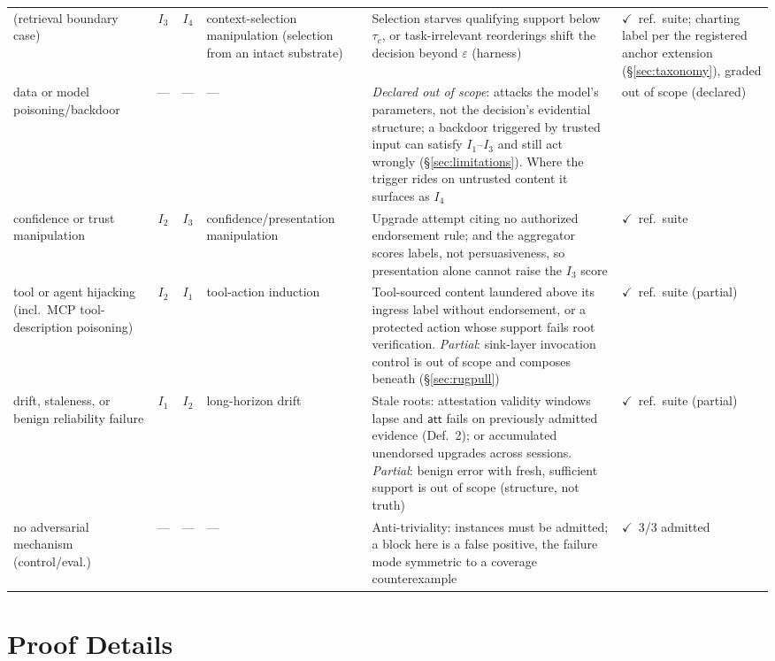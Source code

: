 \documentclass[conference]{IEEEtran}
\newcommand{\Ione}{\ensuremath{I_1}}
\newcommand{\Itwo}{\ensuremath{I_2}}
\newcommand{\Ithree}{\ensuremath{I_3}}
\newcommand{\Ifour}{\ensuremath{I_4}}
\newcommand{\att}{\ensuremath{\mathsf{att}}}
\newcommand{\tick}{\ensuremath{\checkmark}}
\begin{document}
\begin{table}[t]
\begin{tabularx}{\textwidth}{@{}>{\raggedright\arraybackslash}p{2.9cm} c c >{\raggedright\arraybackslash}p{3.1cm} >{\raggedright\arraybackslash}X >{\raggedright\arraybackslash}p{2.2cm}@{}}
(retrieval boundary case) & \Ithree & \Ifour & context-selection manipulation (selection from an intact substrate) & Selection starves qualifying support below $\tau_c$, or task-irrelevant reorderings shift the decision beyond $\varepsilon$ (harness) & \tick\ ref.\ suite; charting label per the registered anchor extension (\S\ref{sec:taxonomy}), graded \\
data or model poisoning/backdoor & --- & --- & --- & \emph{Declared out of scope}: attacks the model's parameters, not the decision's evidential structure; a backdoor triggered by trusted input can satisfy \Ione--\Ithree{} and still act wrongly (\S\ref{sec:limitations}). Where the trigger rides on untrusted content it surfaces as \Ifour & out of scope (declared) \\
confidence or trust manipulation & \Itwo & \Ithree & confidence/presentation manipulation & Upgrade attempt citing no authorized endorsement rule; and the aggregator scores labels, not persuasiveness, so presentation alone cannot raise the \Ithree{} score & \tick\ ref.\ suite \\
tool or agent hijacking (incl.\ MCP tool-description poisoning) & \Itwo & \Ione & tool-action induction & Tool-sourced content laundered above its ingress label without endorsement, or a protected action whose support fails root verification. \emph{Partial}: sink-layer invocation control is out of scope and composes beneath (\S\ref{sec:rugpull}) & \tick\ ref.\ suite (partial) \\
drift, staleness, or benign reliability failure & \Ione & \Itwo & long-horizon drift & Stale roots: attestation validity windows lapse and $\att$ fails on previously admitted evidence (Def.~2); or accumulated unendorsed upgrades across sessions. \emph{Partial}: benign error with fresh, sufficient support is out of scope (structure, not truth) & \tick\ ref.\ suite (partial) \\
no adversarial mechanism (control/eval.) & --- & --- & --- & Anti-triviality: instances must be admitted; a block here is a false positive, the failure mode symmetric to a coverage counterexample & \tick\ 3/3 admitted \\
\bottomrule
\end{tabularx}
\end{table}

\section{Proof Details}
\label{app:proofs}
\end{document}
